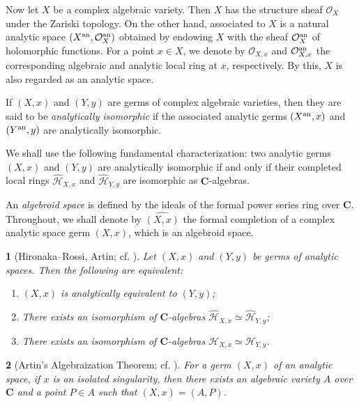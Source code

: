 \documentclass[english,10pt,reqno,twoside]{amsart}
\numberwithin{equation}{section}
\numberwithin{figure}{section}
\theoremstyle{plain}
\newtheorem{thm}{\protect\theoremname}
\theoremstyle{plain}
\theoremstyle{definition}
\providecommand{\theoremname}{Theorem}
\theoremstyle{plain}
\numberwithin{equation}{section}
\newcommand{\C}{\mathbf{C}}
\begin{document}
Now let $X$ be a complex algebraic variety. Then $X$ has the structure sheaf $\mathcal{O}_X$ under the Zariski topology. On the other hand, associated to $X$ is a natural analytic space $(X^{\rm an},\mathcal{O}^{\rm an}_X)$ obtained by endowing $X$ with the sheaf $\mathcal{O}^{\rm an}_X$ of holomorphic functions. For a point $x \in X$, we denote by $\mathcal{O}_{X,x}$ and $\mathcal{O}^{\rm an}_{X,x}$ the corresponding algebraic and analytic local ring at $x$, respectively. By this, $X$ is also regarded as an analytic space.

If $(X,x)$ and $(Y,y)$ are germs of complex algebraic varieties, then they are said to be \emph{analytically isomorphic} if the associated analytic germs $(X^{\rm an},x)$ and $(Y^{\rm an},y)$ are analytically isomorphic.

We shall use the following fundamental characterization: two analytic germs $(X,x)$ and $(Y,y)$ are analytically isomorphic if and only if their completed local rings $\widehat{\mathcal{H}}_{X,x}$ and $\widehat{\mathcal{H}}_{Y,y}$ are isomorphic as $\C$-algebras.

An \emph{algebroid space} is defined by the ideals of the formal power series ring over $\C$. Throughout, we shall denote by $\widehat{(X,x)}$ the formal completion of a complex analytic space germ $(X,x)$, which is an algebroid space.

\begin{thm}[{Hironaka--Rossi, Artin; cf. \cite[Theorem 4.2.3]{Ish2014}}]\label{Thm: Artin's approximation}
Let $(X,x)$ and $(Y,y)$ be germs of analytic spaces. Then the following are equivalent:
\begin{enumerate}[\indent\rm(1)]
\item $(X,x)$ is analytically equivalent to $(Y,y)$;

\item There exists an isomorphism of $\C$-algebras $\widehat{\mathcal{H}}_{X,x}\simeq \widehat{\mathcal{H}}_{Y,y}$;

\item There exists an isomorphism of $\C$-algebras $\mathcal{H}_{X,x}\simeq \mathcal{H}_{Y,y}$.
\end{enumerate}
\end{thm}

\begin{thm}[{Artin's Algebraization Theorem; cf. \cite[Theorem 4.2.4]{Ish2014}}]\label{Thm: Artin's algebraization}
For a germ $(X,x)$ of an analytic space, if $x$ is an isolated singularity, then there exists an algebraic variety $A$ over $\C$ and a point $P \in A$ such that $(X,x)=(A,P)$.
\end{thm}
\end{document}
